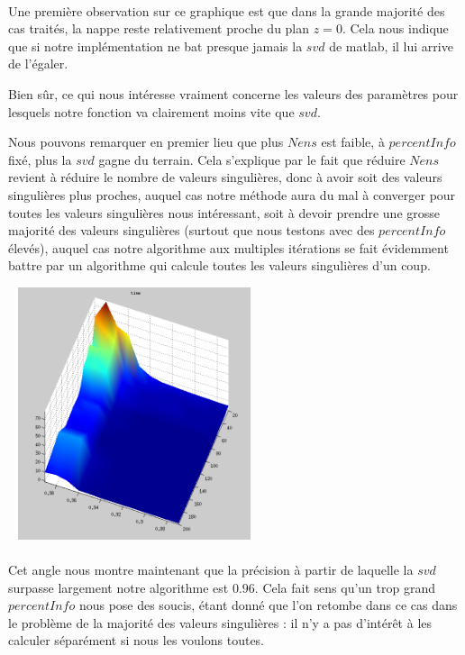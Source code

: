 \documentclass[a4paper,12pt]{article}
\begin{document}
    \paragraph{}
    Une première observation sur ce graphique est que dans la grande majorité
    des cas traités, la nappe reste relativement proche du plan $z=0$. Cela
    nous indique que si notre implémentation ne bat presque jamais la $svd$
    de matlab, il lui arrive de l'égaler.

    Bien sûr, ce qui nous intéresse vraiment concerne les valeurs des paramètres
    pour lesquels notre fonction va clairement moins vite que $svd$.

    Nous pouvons remarquer en premier lieu que plus $Nens$ est faible, à
    $percentInfo$
    fixé, plus la $svd$ gagne du terrain. Cela s'explique par le fait que réduire
    $Nens$ revient à réduire le nombre de valeurs singulières, donc à avoir soit des
    valeurs singulières plus proches, auquel cas notre méthode aura du mal à
    converger pour toutes les valeurs singulières nous intéressant, soit à devoir
    prendre une grosse majorité des valeurs singulières (surtout que nous testons
    avec des $percentInfo$ élevés), auquel cas notre algorithme aux multiples itérations
    se fait évidemment battre par un algorithme qui calcule toutes les valeurs
    singulières d'un coup.

    \bigskip
    \begin{center}
    \includegraphics[width=20em, height=20em]{time2.png}
    \end{center}

    \paragraph{}
    Cet angle nous montre maintenant que la précision à partir de laquelle la $svd$
    surpasse largement notre algorithme est $0.96$. Cela fait sens qu'un trop grand
    $percentInfo$ nous pose des soucis, étant donné que l'on retombe dans ce cas
    dans le problème de la majorité des valeurs singulières : il n'y a pas
    d'intérêt à les calculer séparément si nous les voulons toutes.
\end{document}
